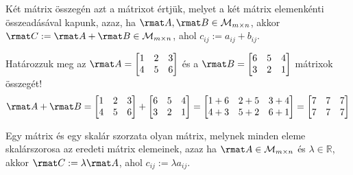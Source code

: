 \documentclass[a4paper, 12pt]{scrartcl}
\begin{document}
\begin{definition}
  Két mátrix összegén azt a mátrixot értjük, melyet a két mátrix elemenkénti
  összeadásával kapunk, azaz, ha $\rmat A, \rmat B \in \mathcal M_{m \times n}$,
  akkor $\rmat C := \rmat A + \rmat B \in \mathcal M_{m \times n}$, ahol
  $c_{ij} := a_{ij} + b_{ij}$.
\end{definition}

\begin{example}
  Határozzuk meg az $\rmat A = \begin{bmatrix}
      1 & 2 & 3 \\
      4 & 5 & 6
    \end{bmatrix}$ és a $\rmat B = \begin{bmatrix}
      6 & 5 & 4 \\
      3 & 2 & 1
    \end{bmatrix}$ mátrixok összegét!
  $$
    \rmat A + \rmat B
    =
    \begin{bmatrix}
      1 & 2 & 3 \\
      4 & 5 & 6
    \end{bmatrix}
    +
    \begin{bmatrix}
      6 & 5 & 4 \\
      3 & 2 & 1
    \end{bmatrix}
    =
    \begin{bmatrix}
      1 + 6 & 2 + 5 & 3 + 4 \\
      4 + 3 & 5 + 2 & 6 + 1
    \end{bmatrix}
    =
    \begin{bmatrix}
      7 & 7 & 7 \\
      7 & 7 & 7
    \end{bmatrix}
  $$
\end{example}

\begin{definition}
  Egy mátrix és egy skalár szorzata olyan mátrix, melynek minden eleme
  skalárszorosa az eredeti mátrix elemeinek, azaz ha
  $\rmat A \in \mathcal M_{m \times n}$ és $\lambda \in \mathbb R$, akkor
  $\rmat C := \lambda \rmat A$, ahol $c_{ij} := \lambda a_{ij}$.
\end{definition}
\end{document}
